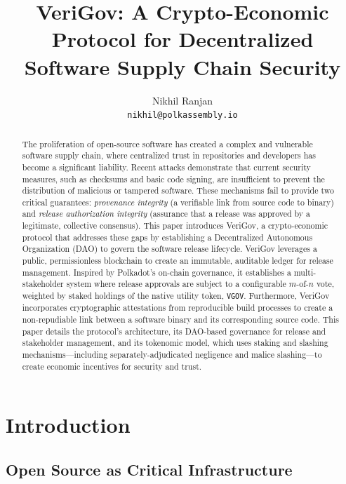 \documentclass{article}
\title{VeriGov: A Crypto-Economic Protocol for Decentralized Software Supply Chain Security}
\author{
  Nikhil Ranjan \\
  \texttt{nikhil@polkassembly.io} \\
}
\begin{document}
\maketitle

\begin{abstract}
The proliferation of open-source software has created a complex and vulnerable software supply chain, where centralized trust in repositories and developers has become a significant liability. Recent attacks demonstrate that current security measures, such as checksums and basic code signing, are insufficient to prevent the distribution of malicious or tampered software. These mechanisms fail to provide two critical guarantees: \emph{provenance integrity} (a verifiable link from source code to binary) and \emph{release authorization integrity} (assurance that a release was approved by a legitimate, collective consensus). This paper introduces VeriGov, a crypto-economic protocol that addresses these gaps by establishing a Decentralized Autonomous Organization (DAO) to govern the software release lifecycle. VeriGov leverages a public, permissionless blockchain to create an immutable, auditable ledger for release management. Inspired by Polkadot's on-chain governance, it establishes a multi-stakeholder system where release approvals are subject to a configurable $m$-of-$n$ vote, weighted by staked holdings of the native utility token, \texttt{VGOV}. Furthermore, VeriGov incorporates cryptographic attestations from reproducible build processes to create a non-repudiable link between a software binary and its corresponding source code. This paper details the protocol's architecture, its DAO-based governance for release and stakeholder management, and its tokenomic model, which uses staking and slashing mechanisms---including separately-adjudicated negligence and malice slashing---to create economic incentives for security and trust.
\end{abstract}

\section{Introduction}
\label{sec:introduction}

\subsection{Open Source as Critical Infrastructure}
\end{document}
